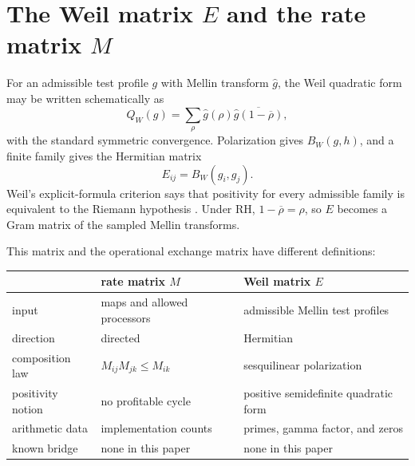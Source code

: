 \documentclass[11pt]{article}
\theoremstyle{definition}
\theoremstyle{plain}
\theoremstyle{remark}
\begin{document}
\section{The Weil matrix \texorpdfstring{\(E\)}{E} and the rate matrix
\texorpdfstring{\(M\)}{M}}
\label{sec:weil}

For an admissible test profile \(g\) with Mellin transform \(\widehat g\), the
Weil quadratic form may be written schematically as
\[
  Q_W(g)=\sum_\rho
  \widehat g(\rho)
  \overline{\widehat g(1-\overline\rho)},
\]
with the standard symmetric convergence.  Polarization gives
\(B_W(g,h)\), and a finite family gives the Hermitian matrix
\[
  E_{ij}=B_W(g_i,g_j).
\]
Weil's explicit-formula criterion says that positivity for every admissible
family is equivalent to the Riemann hypothesis
\cite{weil-explicit}.  Under RH, \(1-\overline\rho=\rho\), so \(E\) becomes a
Gram matrix of the sampled Mellin transforms.

This matrix and the operational exchange matrix have different definitions:
\begin{center}
\begin{tabular}{@{}p{}p{}p{}@{}}
\toprule
 & rate matrix \(M\) & Weil matrix \(E\)\\
\midrule
input & maps and allowed processors & admissible Mellin test profiles\\
direction & directed & Hermitian\\
composition law & \(M_{ij}M_{jk}\le M_{ik}\) & sesquilinear polarization\\
positivity notion & no profitable cycle & positive semidefinite quadratic form\\
arithmetic data & implementation counts & primes, gamma factor, and zeros\\
known bridge & none in this paper & none in this paper\\
\bottomrule
\end{tabular}
\end{center}
\end{document}

